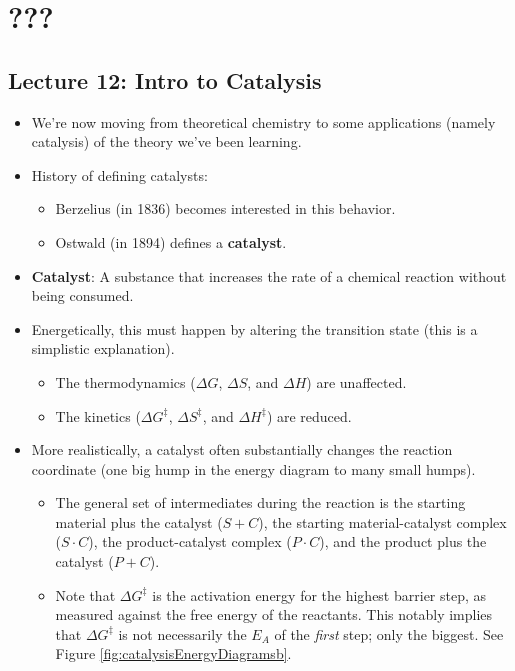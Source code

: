 \documentclass[../notes.tex]{subfiles}
\begin{document}
\chapter{???}
\section{Lecture 12: Intro to Catalysis}
\begin{itemize}
    \item {}We're now moving from theoretical chemistry to some applications (namely catalysis) of the theory we've been learning.
    \item History of defining catalysts:
    \begin{itemize}
        \item Berzelius (in 1836) becomes interested in this behavior.
        \item Ostwald (in 1894) defines a \textbf{catalyst}.
    \end{itemize}
    \item \textbf{Catalyst}: A substance that increases the rate of a chemical reaction without being consumed.
    \item Energetically, this must happen by altering the transition state (this is a simplistic explanation).
    \begin{itemize}
        \item The thermodynamics ($\Delta G$, $\Delta S$, and $\Delta H$) are unaffected.
        \item The kinetics ($\Delta G^\ddagger$, $\Delta S^\ddagger$, and $\Delta H^\ddagger$) are reduced.
    \end{itemize}
    \item More realistically, a catalyst often substantially changes the reaction coordinate (one big hump in the energy diagram to many small humps).
    \begin{itemize}
        \item The general set of intermediates during the reaction is the starting material plus the catalyst ($S+C$), the starting material-catalyst complex ($S\cdot C$), the product-catalyst complex ($P\cdot C$), and the product plus the catalyst ($P+C$).
        \item Note that $\Delta G^\ddagger$ is the activation energy for the highest barrier step, as measured against the free energy of the reactants. This notably implies that $\Delta G^\ddagger$ is not necessarily the $E_A$ of the \emph{first} step; only the biggest. See Figure \ref{fig:catalysisEnergyDiagramsb}.

\end{itemize}
\end{itemize}
\end{document}
